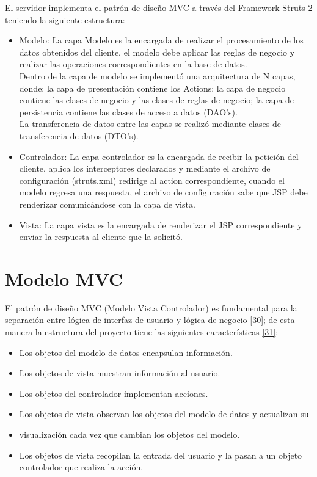 El servidor implementa el patrón de diseño MVC a través del Framework Struts 2 teniendo la siguiente estructura:
\begin{itemize}
	\item Modelo: La capa Modelo es la encargada de realizar el procesamiento de los datos obtenidos del cliente, el modelo debe aplicar las reglas de negocio y realizar las operaciones correspondientes en la base de datos.\\
	
	Dentro de la capa de modelo se implementó una arquitectura de N capas, donde: la capa de presentación contiene los Actions; la capa de negocio contiene las clases de negocio y las clases de reglas de negocio; la capa de persistencia contiene las clases de acceso a datos (DAO’s).\\
	
	La transferencia de datos entre las capas se realizó mediante clases de transferencia de datos (DTO’s).
	
	\item Controlador: La capa controlador es la encargada de recibir la petición del cliente, aplica los interceptores declarados y mediante el archivo de configuración (struts.xml) redirige al action correspondiente, cuando el modelo regresa una respuesta, el archivo de configuración sabe que JSP debe renderizar comunicándose con la capa de vista.
	
	\item Vista: La capa vista es la encargada de renderizar el JSP correspondiente y enviar la respuesta al cliente que la solicitó.
\end{itemize}


\section{Modelo MVC}
El patrón de diseño MVC (Modelo Vista Controlador) es fundamental para la separación entre lógica de interfaz de usuario y lógica de negocio \hyperlink{b30}{[30]}; de esta manera la estructura del proyecto tiene las siguientes características \hyperlink{b31}{[31]}:

\begin{itemize}
	\item Los objetos del modelo de datos encapsulan información.
	\item Los objetos de vista muestran información al usuario.
	\item Los objetos del controlador implementan acciones.
	\item Los objetos de vista observan los objetos del modelo de datos y actualizan su \item visualización cada vez que cambian los objetos del modelo.
	\item Los objetos de vista recopilan la entrada del usuario y la pasan a un objeto controlador que realiza la acción. 
\end{itemize}

